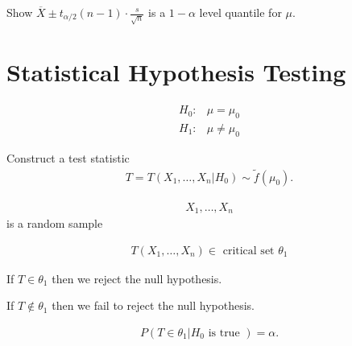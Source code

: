 \documentclass[10pt]{article}
\begin{document}
\begin{exercise}[]  \label{exe:}
Show \(\overline{X} \pm t _{\alpha  / 2} (n - 1) \cdot \frac{s}{\sqrt{n}}\) is a \(1 - \alpha\) level quantile for \(\mu\).
\end{exercise}


\section{Statistical Hypothesis Testing}
\label{sec:org143dc20}


\begin{align*}
H_0 :  &  \mu = \mu  _{0}  \\
H_1 :  &  \mu \neq \mu  _{0} 
\end{align*}

Construct a test statistic
\begin{align*}
T = T(X_1, \dots , X_n | H_0) \sim \tilde{f}(\mu  _{0} ).
\end{align*}

\begin{align*}
X_1, \dots , X_n
\end{align*}
is a random sample

\begin{align*}
T(X_1 , \dots , X_n) \in  \text{ critical set } \theta  _{1} 
\end{align*}

If \(T \in  \theta  _{1}\) then we reject the null hypothesis.

If \(T \not\in \theta  _{1}\) then we fail to reject the null hypothesis.

\begin{align*}
P(T \in  \theta  _{1}  | H_0 \text{ is true }) = \alpha .
\end{align*}
\end{document}
